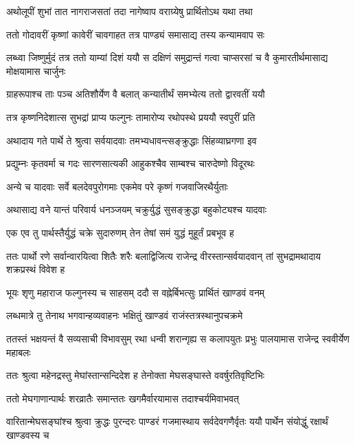 \twolineshloka
{अथोलूपीं शुभां तात नागराजसतां तदा}
{नागेष्वाप वराग्र्येषु प्रार्थितोऽथ यथा तथा}


\twolineshloka
{ततो गोदावरीं कृष्णां कावेरीं चावगाहत}
{तत्र पाण्ड्यं समासाद्य तस्य कन्यामवाप सः}


लब्ध्वा जिष्णुर्मुदं तत्र ततो याम्यां दिशं ययौ
\twolineshloka
{स दक्षिणं समुद्रान्तं गत्वा चाप्सरसां च वै}
{कुमारतीर्थमासाद्य मोक्षयामास चार्जुनः}


\threelineshloka
{ग्राहरूपाश्च ताः पञ्च अतिशौर्येण वै बलात्}
{कन्यातीर्थं समभ्येत्य ततो द्वारवतीं ययौ}
{}


\twolineshloka
{तत्र कृष्णनिदेशात्स सुभद्रां प्राप्य फल्गुनः}
{तामारोप्य रथोपस्थे प्रययौ स्वपुरीं प्रति}


\twolineshloka
{अथादाय गते पार्थे ते श्रुत्वा सर्वयादवाः}
{तमभ्यधावन्त्सङ्क्रुद्धाः सिंहव्याघ्रगणा इव}


\twolineshloka
{प्रद्युम्नः कृतवर्मा च गदः सारणसात्यकी}
{आहुकश्चैव साम्बश्च चारुदेष्णो विदूरथः}


\twolineshloka
{अन्ये च यादवाः सर्वे बलदेवपुरोगमाः}
{एकमेव परे कृष्णं गजवाजिरथैर्युताः}


\twolineshloka
{अथासाद्य वने यान्तं परिवार्य धनञ्जयम्}
{चक्रुर्युद्धं सुसङ्क्रुद्धा बहुकोट्यश्च यादवाः}


\twolineshloka
{एक एव तु पार्थस्तैर्युद्धं चक्रे सुदारुणम्}
{तेन तेषां समं युद्धं मुहूर्तं प्रबभूव ह}


\threelineshloka
{ततः पार्थो रणे सर्वान्वारयित्वा शितैः शरैः}
{बलाद्विजित्य राजेन्द्र वीरस्तान्सर्वयादवान्}
{तां सुभद्रामथादाय शक्रप्रस्थं विवेश ह}


\twolineshloka
{भूयः शृणु महाराज फल्गुनस्य च साहसम्}
{ददौ स वह्नेर्बिभत्सुः प्रार्थितं खाण्डवं वनम्}


\twolineshloka
{लब्धमात्रे तु तेनाथ भगवान्हव्यवाहनः}
{भक्षितुं खाण्डवं राजंस्तत्रस्थानुपचक्रमे}


\threelineshloka
{ततस्तं भक्षयन्तं वै सव्यसाची विभावसुम्}
{रथा धन्वी शरान्गृह्य स कलापयुतः प्रभुः}
{पालयामास राजेन्द्र स्ववीर्येण महाबलः}


\twolineshloka
{ततः श्रुत्वा महेनद्रस्तु मेघांस्तान्सन्दिदेश ह}
{तेनोक्ता मेघसङ्घास्ते ववर्षुरतिवृष्टिभिः}


\twolineshloka
{ततो मेघगाणान्पार्थः शरव्रातैः समान्ततः}
{खगमैर्वारयामास तदाश्चर्यमिवाभवत्}


\threelineshloka
{वारितान्मेघसङ्घांश्च श्रुत्वा क्रुद्धः पुरन्दरः}
{पाण्डरं गजमास्थाय सर्वदेवगणैर्वृतः}
{ययौ पार्थेन संयोद्धुं रक्षार्थं खाण्डवस्य च}


